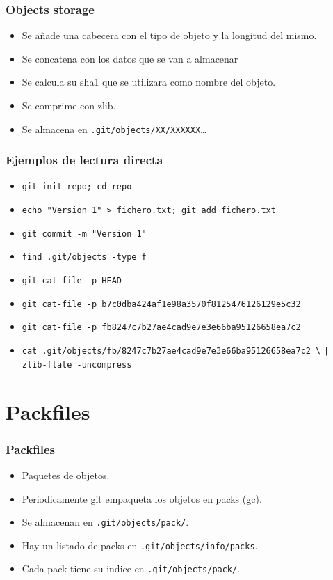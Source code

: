 \documentclass[10pt]{beamer}
\begin{document}
  \begin{frame}[containsverbatim]
    \frametitle{Objects storage}
    \begin{itemize}
        \item Se añade una cabecera con el tipo de objeto y la longitud del mismo.
        \item Se concatena con los datos que se van a almacenar
        \item Se calcula su sha1 que se utilizara como nombre del objeto.
        \item Se comprime con zlib.
        \item Se almacena en \verb$.git/objects/XX/XXXXXX$\dots{}
    \end{itemize}
  \end{frame}

  \begin{frame}[containsverbatim]
    \frametitle{Ejemplos de lectura directa}
    \begin{itemize}
        \item \verb$git init repo; cd repo$
        \item \verb$echo "Version 1" > fichero.txt; git add fichero.txt$
        \item \verb$git commit -m "Version 1"$
        \item \verb$find .git/objects -type f$
        \item \verb$git cat-file -p HEAD$
        \item \verb$git cat-file -p b7c0dba424af1e98a3570f8125476126129e5c32$
        \item \verb$git cat-file -p fb8247c7b27ae4cad9e7e3e66ba95126658ea7c2$
        \item \verb$cat .git/objects/fb/8247c7b27ae4cad9e7e3e66ba95126658ea7c2 \$ \verb$| zlib-flate -uncompress$
    \end{itemize}
  \end{frame}

  \section*{Packfiles}

  \begin{frame}[containsverbatim]
    \frametitle{Packfiles}
    \begin{itemize}
        \item Paquetes de objetos.
        \item Periodicamente git empaqueta los objetos en packs (gc).
        \item Se almacenan en \verb$.git/objects/pack/$.
        \item Hay un listado de packs en \verb$.git/objects/info/packs$.
        \item Cada pack tiene su indice en \verb$.git/objects/pack/$.
    \end{itemize}
  \end{frame}
\end{document}
